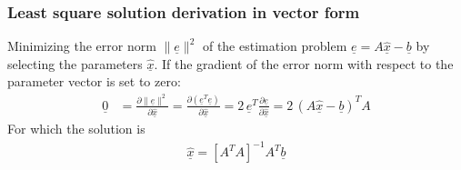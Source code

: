 \subsubsection{Least square solution derivation in vector form}

Minimizing the error norm $\|\underline{e}\|^2$ of the estimation problem $\underline{e} = A \underline{\hat{x}} - \underline{b}$ by selecting the parameters $\underline{\hat{x}}$. If the gradient of the error norm with respect to the parameter vector is set to zero:
\begin{align}
\underline{0} &= \frac{\partial \|\underline{e}\|^2 }{\partial \underline{\hat{x}}} = \frac{\partial (\underline{e}^T \underline{e} )}{\partial \underline{\hat{x}}} = 2 \, \underline{e}^T \frac{\partial \underline{e} }{\partial \underline{\hat{x}}} = 2\, (A \underline{\hat{x}} - \underline{b})^T A 
\end{align}
For which the solution is
\begin{align}
\underline{\hat{x}} = \left[ A^T A \right]^{-1} A^T \underline{b}
\end{align}